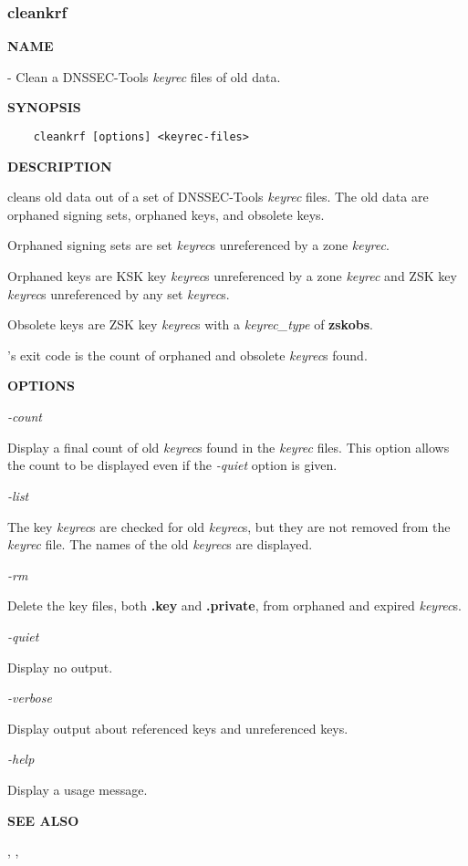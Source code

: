 \clearpage

\subsubsection{\bf cleankrf}

{\bf NAME}

 - Clean a DNSSEC-Tools {\it keyrec} files of old data.

{\bf SYNOPSIS}

\begin{verbatim}
    cleankrf [options] <keyrec-files>
\end{verbatim}

{\bf DESCRIPTION}

 cleans old data out of a set of DNSSEC-Tools {\it keyrec} files.
The old data are orphaned signing sets, orphaned keys, and obsolete keys.

Orphaned signing sets are set {\it keyrec}s unreferenced by a zone {\it keyrec}.

Orphaned keys are KSK key {\it keyrec}s unreferenced by a zone {\it keyrec}
and ZSK key {\it keyrec}s unreferenced by any set {\it keyrec}s.

Obsolete keys are ZSK key {\it keyrec}s with a {\it keyrec\_type} of {\bf
zskobs}.

's exit code is the count of orphaned and obsolete {\it keyrec}s
found.

{\bf OPTIONS}

\begin{description}

\item {\it -count}\verb" "

Display a final count of old {\it keyrec}s found in the {\it keyrec} files.
This option allows the count to be displayed even if the {\it -quiet} option
is given.

\item {\it -list}\verb" "

The key {\it keyrec}s are checked for old {\it keyrec}s, but they are not
removed from the {\it keyrec} file.  The names of the old {\it keyrec}s are
displayed.

\item {\it -rm}\verb" "

Delete the key files, both {\bf .key} and {\bf .private}, from orphaned and
expired {\it keyrec}s.

\item {\it -quiet}\verb" "

Display no output.

\item {\it -verbose}\verb" "

Display output about referenced keys and unreferenced keys.

\item {\it -help}\verb" "

Display a usage message.

\end{description}

{\bf SEE ALSO}

,
,


